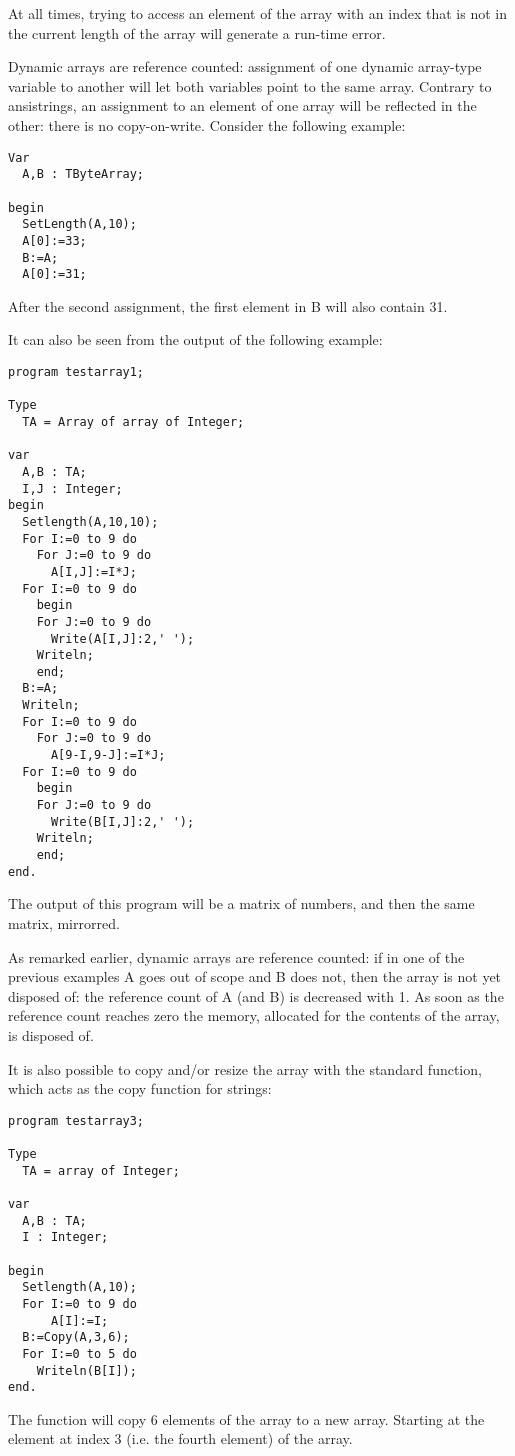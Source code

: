 At all times, trying to access an element of the array with an index 
that is not in the current length of the array will generate a run-time 
error.

Dynamic arrays are reference counted: assignment of one dynamic array-type 
variable to another will let both variables point to the same array. 
Contrary to ansistrings, an assignment to an element of one array will 
be reflected in the other: there is no copy-on-write. Consider the following
example:
\begin{verbatim}
Var
  A,B : TByteArray;

begin
  SetLength(A,10);
  A[0]:=33;
  B:=A;
  A[0]:=31;
\end{verbatim}
After the second assignment, the first element in B will also contain 31.

It can also be seen from the output of the following example:
\begin{verbatim}
program testarray1;

Type
  TA = Array of array of Integer;
  
var   
  A,B : TA;
  I,J : Integer;
begin
  Setlength(A,10,10);
  For I:=0 to 9 do
    For J:=0 to 9 do 
      A[I,J]:=I*J;
  For I:=0 to 9 do
    begin
    For J:=0 to 9 do 
      Write(A[I,J]:2,' ');
    Writeln;
    end;
  B:=A;
  Writeln;
  For I:=0 to 9 do
    For J:=0 to 9 do 
      A[9-I,9-J]:=I*J;
  For I:=0 to 9 do
    begin
    For J:=0 to 9 do 
      Write(B[I,J]:2,' ');
    Writeln;
    end;
end.  
\end{verbatim}
The output of this program will be a matrix of numbers, and then the same matrix, mirrorred.

As remarked earlier, dynamic arrays are reference counted: if in one of the previous examples A
goes out of  scope and B does not, then the array is not yet disposed of: the
reference count of A (and B) is decreased with 1. As soon as the reference
count reaches zero the memory, allocated for the contents of the array, is disposed of.

It is also possible to copy and/or resize the array with the standard 
 function, which acts as the copy function for strings:
\begin{verbatim}
program testarray3;

Type
  TA = array of Integer;
  
var   
  A,B : TA;
  I : Integer;

begin
  Setlength(A,10);
  For I:=0 to 9 do
      A[I]:=I;
  B:=Copy(A,3,6);    
  For I:=0 to 5 do
    Writeln(B[I]);
end.  
\end{verbatim}
The  function will copy 6 elements of the array to a new array.
Starting at the element at index 3 (i.e. the fourth element) of the array.

